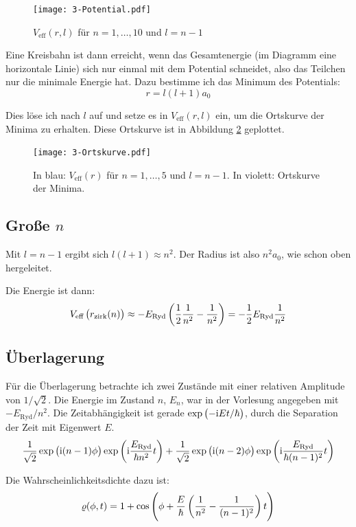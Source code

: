 \begin{figure}
	\centering
	\texttt{[image: 3-Potential.pdf]}
	\caption{$V_\text{eff}(r, l)$ für $n = 1, \ldots, 10$ und $l = n - 1$}
	\label{fig:1}
\end{figure}

Eine Kreisbahn ist dann erreicht, wenn das Gesamtenergie (im Diagramm eine
horizontale Linie) sich nur einmal mit dem Potential schneidet, also das
Teilchen nur die minimale Energie hat. Dazu bestimme ich das Minimum des
Potentials:
\[
	r = l(l+1) a_0
\]

Dies löse ich nach $l$ auf und setze es in $V_\text{eff}(r, l)$ ein, um die
Ortskurve der Minima zu erhalten. Diese Ortskurve ist in Abbildung \ref{fig:2}
geplottet.

\begin{figure}
	\centering
	\texttt{[image: 3-Ortskurve.pdf]}
	\caption{%
		In blau: $V_\text{eff}(r)$ für $n = 1, \ldots, 5$ und $l = n - 1$. In
		violett: Ortskurve der Minima.
	}
	\label{fig:2}
\end{figure}

\subsection{Große $n$}

Mit $l = n - 1$ ergibt sich $l(l+1) \approx n^2$. Der Radius ist also $n^2 a_0$, wie schon oben hergeleitet.

Die Energie ist dann:
\[
	V_\text{eff}\del{r_\text{zirk}(n)}
	\approx - E_\text{Ryd} \del{\half \frac1{n^2} - \frac1{n^2}}
	= - \half E_\text{Ryd} \frac1{n^2}
\]

\subsection{Überlagerung}

Für die Überlagerung betrachte ich zwei Zustände mit einer relativen Amplitude
von $1/\sqrt2$. Die Energie im Zustand $n$, $E_n$, war in der Vorlesung
angegeben mit $-E_\text{Ryd}/n^2$. Die Zeitabhängigkeit ist gerade
$\exp\del{-\ii Et/\hbar}$, durch die Separation der Zeit mit Eigenwert $E$.
\[
	\frac1{\sqrt2} \exp\del{\ii (n-1) \phi} \exp\del{\ii \frac{E_\text{Ryd}}{\hbar n^2} t}
	+
	\frac1{\sqrt2} \exp\del{\ii (n-2) \phi} \exp\del{\ii \frac{E_\text{Ryd}}{\hbar (n-1)^2} t}
\]

Die Wahrscheinlichkeitsdichte dazu ist:
\[
	\varrho(\phi, t)
	= 1 + \cos\del{\phi + \frac{E}\hbar \del{\frac1{n^2} - \frac1{(n-1)^2}}t}
\]

